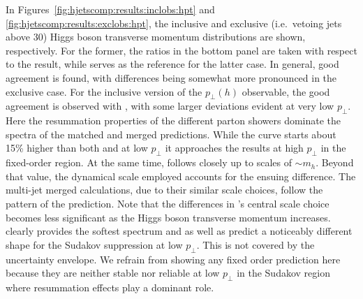 In Figures~\ref{fig:hjetscomp:results:inclobs:hpt} and
\ref{fig:hjetscomp:results:exclobs:hpt}, the inclusive and exclusive
(i.e.~vetoing jets above $30$\gev) Higgs boson transverse momentum
distributions are shown, respectively.  For the former, the ratios in
the bottom panel are taken with respect to the \HqT result, while
\Powheg \NNLOPS serves as the reference for the latter case. In
general, good agreement is found, with differences being somewhat more
pronounced in the exclusive case. For the inclusive version of the
$p_\perp(h)$ observable, the good agreement is observed with \HqT,
with some larger deviations evident at very low $p_\perp$. Here the 
resummation properties of the different parton showers dominate the 
spectra of the matched and merged predictions. While the
\Sherpa \NNLOPS curve starts about 15\% higher than both \HqT and \Powheg 
\NNLOPS at low $p_\perp$ it approaches the \HqT results at high $p_\perp$ 
in the fixed-order region. At the same time, \Powheg \NNLOPS follows 
\HqT closely up to scales of $\sim m_h$. Beyond that value, the 
dynamical scale employed \Powheg \NNLOPS accounts for the ensuing 
difference. The multi-jet merged calculations, due to their similar 
scale choices, follow the pattern of the \Powheg \NNLOPS prediction.
Note that the differences in \MGaMC's central scale
choice becomes less significant as the Higgs boson transverse momentum
increases. \Herwig clearly provides the softest spectrum and \Sherpa
as well as \MGaMC predict a noticeably different shape for the Sudakov
suppression at low $p_\perp$. This is not covered by the \HqT
uncertainty envelope. We refrain from showing any fixed order
prediction here because they are neither stable nor reliable at low
$p_\perp$ in the Sudakov region where resummation effects play a 
dominant role.


